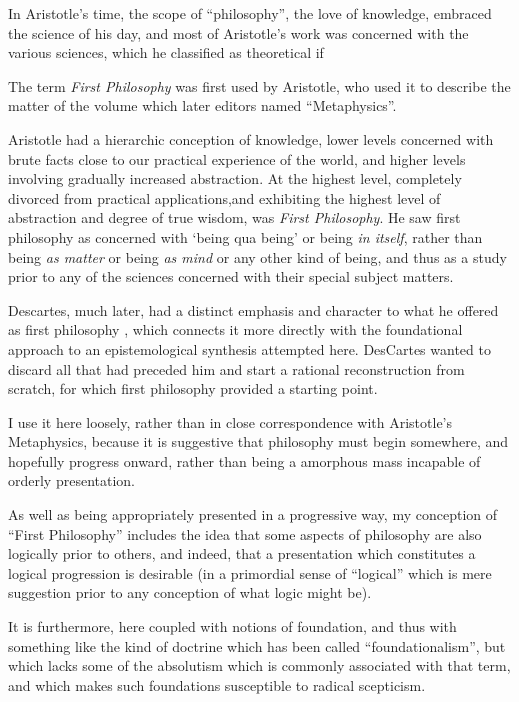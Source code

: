 \documentclass[10pt,titlepage]{book}
\begin{document}
In Aristotle's time, the scope of ``philosophy'', the love of knowledge, embraced the science of his day, and most of Aristotle's work was concerned with the various sciences, which he classified as theoretical if

The term \emph{First Philosophy} was first used by Aristotle, who used it to describe the matter of the volume which later editors named ``Metaphysics''\cite{aristotleMetap}.

Aristotle had a hierarchic conception of knowledge, lower levels concerned with brute facts close to our practical experience of the world, and higher levels involving gradually increased abstraction.
At the highest level, completely divorced from practical applications,and  exhibiting the highest level of abstraction and degree of true wisdom, was \emph{First Philosophy}.
He saw first philosophy as concerned with `being qua being' or being \emph{in  itself}, rather than being \emph{as matter} or being \emph{as mind} or any other kind of being, and thus as a study prior to any of the sciences concerned with their special subject matters.

Descartes, much later, had a distinct emphasis and character to what he offered as first philosophy \cite{descartes2013meditations}, which connects it more directly with the foundational approach to an epistemological synthesis attempted here.
DesCartes wanted to discard all that had preceded him and start a rational reconstruction from scratch, for which first philosophy provided a starting point.

I use it here loosely, rather than in close correspondence with Aristotle's Metaphysics, because it is suggestive that philosophy must begin somewhere, and hopefully progress onward, rather than being a amorphous mass incapable of orderly presentation.

As well as being appropriately presented in a progressive way, my conception of ``First Philosophy'' includes the idea that some aspects of philosophy are also logically prior to others, and indeed, that a presentation which constitutes a logical progression is desirable (in a primordial sense of ``logical'' which is mere suggestion prior to any conception of what logic might be).

It is furthermore, here coupled with notions of foundation, and thus with something like the kind of doctrine which has been called ``foundationalism'', but which lacks some of the absolutism which is commonly associated with that term, and which makes such foundations susceptible to radical scepticism.
\end{document}

